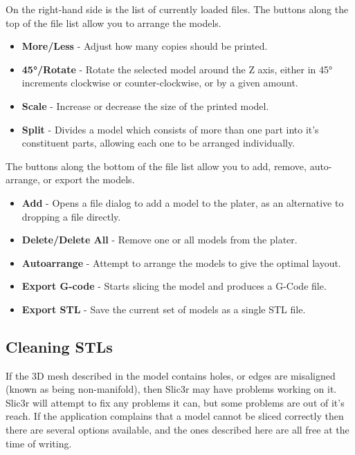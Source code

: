 On the right-hand side is the list of currently loaded files.  The buttons along the top of the file list allow you to arrange the models.
\begin{itemize}
	\item \textbf{More/Less}  - Adjust how many copies should be printed.
	\item \textbf{45°/Rotate}  - Rotate the selected model around the Z axis, either in 45° increments clockwise or counter-clockwise, or by a given amount.
	\item \textbf{Scale}  - Increase or decrease the size of the printed model.
	\item \textbf{Split}  - Divides a model which consists of more than one part into it's constituent parts, allowing each one to be arranged individually.
\end{itemize}

The buttons along the bottom of the file list allow you to add, remove, auto-arrange, or export the models.
\begin{itemize}
	\item \textbf{Add}  - Opens a file dialog to add a model to the plater, as an alternative to dropping a file directly.
	\item \textbf{Delete/Delete All}  - Remove one or all models from the plater.
	\item \textbf{Autoarrange}  - Attempt to arrange the models to give the optimal layout.
	\item \textbf{Export G-code}  - Starts slicing the model and produces a G-Code file.
	\item \textbf{Export STL}  - Save the current set of models as a single STL file.
\end{itemize}



\subsection{Cleaning STLs} %
\label{sub:cleaning_stls}
If the 3D mesh described in the model contains holes, or edges are misaligned (known as being non-manifold), then Slic3r may have problems working on it.  Slic3r will attempt to fix any problems it can, but some problems are out of it's reach.  If the application complains that a model cannot be sliced correctly then there are several options available, and the ones described here are all free at the time of writing.

